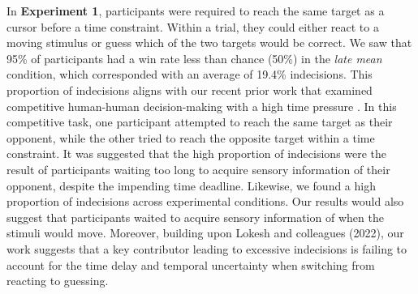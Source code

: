 \documentclass[man,donotrepeattitle,floatsintext,letterpaper,12pt]{apa7}
\newcommand\boldblue[1]{\textcolor{mydarkblue}{\textbf{#1}}}
\begin{document}
In \boldblue{Experiment 1}, participants were required to reach the same target as a cursor before a time constraint. Within a trial, they could either react to a moving stimulus or guess which of the two targets would be correct. We saw that 95\% of participants had a win rate less than chance (50\%) in the \emph{late mean} condition, which corresponded with an average of 19.4\% indecisions. This proportion of indecisions aligns with our recent prior work that examined competitive human-human decision-making with a high time pressure \autocite{lokeshHumansUtilizeSensory2022}. In this competitive task, one participant attempted to reach the same target as their opponent, while the other tried to reach the opposite target within a time constraint. It was suggested that the high proportion of indecisions were the result of participants waiting too long to acquire sensory information of their opponent, despite the impending time deadline. Likewise, we found a high proportion of indecisions across experimental conditions. Our results would also suggest that participants waited to acquire sensory information of when the stimuli would move. Moreover, building upon Lokesh and colleagues (2022), our work suggests that a key contributor leading to excessive indecisions is failing to account for the time delay and temporal uncertainty when switching from reacting to guessing.
\end{document}
